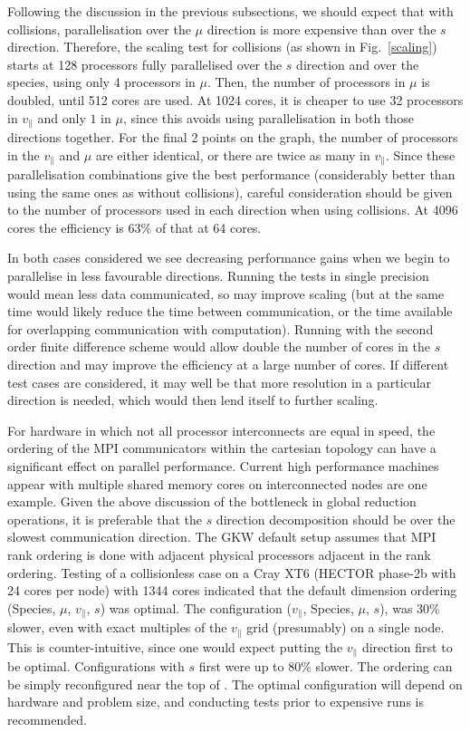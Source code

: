 Following the discussion in the previous subsections, we should expect that with collisions, parallelisation over the $\mu$ direction
is more expensive than over the $s$ direction. Therefore, the scaling test for collisions (as shown in Fig.~\ref{scaling}) starts at 128 processors fully parallelised over the $s$ direction
and over the species, using only 4 processors in $\mu$. Then, the number of processors in $\mu$ is doubled, until 512 cores are used. At 1024 cores, it is cheaper to use 32
processors in $v_\parallel$ and only $1$ in $\mu$, since this avoids using parallelisation in both those directions together. For the final 2 points on the graph, the 
number of processors in the $v_\parallel$ and $\mu$ are either identical, or there are twice as many in $v_\parallel$. Since these
parallelisation combinations give the best performance (considerably better than using the same ones as without collisions), careful consideration should be given to
the number of processors used in each direction when using collisions. At 4096 cores the efficiency is $63\%$ of that at 64 cores.

In both cases considered we see decreasing performance gains when we begin to parallelise in
less favourable directions. Running the tests in single precision would mean less data communicated, so may improve
scaling (but at the same time would likely reduce the time between communication, or the time available for overlapping communication with computation). Running with the second
order finite difference scheme would allow double the number of cores in the $s$ direction and may improve the efficiency
at a large number of cores. If different test cases are considered, it may well be that more resolution in a particular direction
is needed, which would then lend itself to further scaling.

For hardware in which not all processor interconnects are equal in speed, the ordering of the MPI communicators within the cartesian topology 
can have a significant effect on parallel performance.  Current high performance machines appear with multiple shared memory cores on interconnected nodes are one example.  Given the above discussion of the bottleneck in global reduction operations, it is preferable that the $s$ direction decomposition should be over the slowest communication direction.  The GKW default setup assumes that MPI rank ordering is done with adjacent physical processors adjacent in the rank ordering.  Testing of a collisionless case on a Cray XT6 (HECTOR phase-2b with 24 cores per node) with 1344 cores indicated that the default dimension ordering (Species, $\mu$, $v_\parallel$, $s$) was optimal.  The configuration ($v_\parallel$, Species, $\mu$, $s$), was 30\% slower, even with exact multiples of the $v_\parallel$ grid (presumably) on a single node.  This is counter-intuitive, since one would expect putting the $v_\parallel$ direction first to be optimal. Configurations with $s$ first were up to 80\% slower. The ordering can be simply reconfigured near the top of .  The optimal configuration will depend on hardware and problem size, and conducting tests prior to expensive runs is recommended.


